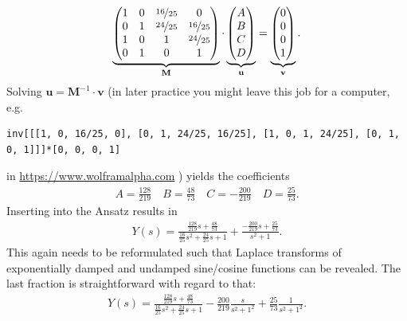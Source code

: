 \documentclass[a4paper,11pt,oneside]{scrartcl}
\begin{document}
%
%
%
\begin{align}
\underbrace{
\begin{pmatrix}
1 & 0 & \nicefrac{16}{25} & 0\\
0 & 1 & \nicefrac{24}{25} & \nicefrac{16}{25}\\
1 & 0 & 1 & \nicefrac{24}{25}\\
0 & 1 & 0 & 1
\end{pmatrix}
}_{\mathbf{M}}
\cdot
\underbrace{
\begin{pmatrix}
A \\
B\\
C\\
D
\end{pmatrix}
}_{\mathbf{u}}
=
\underbrace{
\begin{pmatrix}
0\\
0\\
0\\
1
\end{pmatrix}
}_{\mathbf{v}}
.
\end{align}
%
Solving $\mathbf{u} = \mathbf{M}^{-1} \cdot \mathbf{v}$ (in later practice you
might leave this job for a computer, e.g.
\begin{verbatim}
inv[[[1, 0, 16/25, 0], [0, 1, 24/25, 16/25], [1, 0, 1, 24/25], [0, 1, 0, 1]]]*[0, 0, 0, 1]
\end{verbatim}
in \url{https://www.wolframalpha.com}
) yields the coefficients
\begin{align}
  A = \frac{128}{219}
  \quad B = \frac{48}{73}
  \quad C = -\frac{200}{219}
  \quad D = \frac{25}{73}.
\end{align}
%
%
Inserting into the Ansatz results in
\begin{align}
Y(s) = \frac{\frac{128}{219} s +
\frac{48}{73}}{\frac{16}{25} s^2 +
\frac{24}{25} s + 1} +
\frac{-\frac{200}{219} s +
\frac{25}{73}}{s^2+1}.
\end{align}
This again needs to be reformulated such that Laplace transforms of
exponentially damped and undamped sine/cosine functions can be revealed.
%
The last fraction is straightforward with regard to that:
\begin{align}
Y(s) = \frac{\frac{128}{219} s + \frac{48}{73}}{\frac{16}{25} s^2 + \frac{24}{25} s + 1}
-\frac{200}{219}\frac{s}{s^2+1^2}
+\frac{25}{73}\frac{1}{s^2+1^2}.
\end{align}
\end{document}
